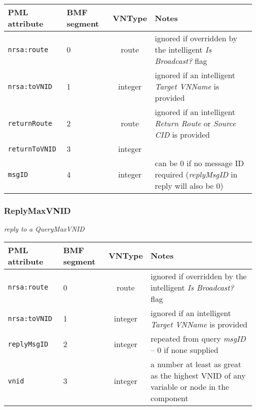 \documentclass[pdftex,a4paper]{article}
\newcommand{\XMLfont}[1]{{\tt \small #1}}
\begin{document}
\begin{table}[!h]
  \begin{center}
    \label{tab:QueryMaxVNID}
    \begin{tabular}{|l|p{13mm}|c|p{60mm}|}
      \hline

      \textbf{PML attribute} & \textbf{BMF segment} & \textbf{VNType}
      & \textbf{Notes} \\\hline

      \XMLfont{nrsa:route} & 0 & route & ignored if overridden by the
      intelligent {\em Is Broadcast?} flag \\\hline

      \XMLfont{nrsa:toVNID} & 1 & integer & ignored if an intelligent {\em
      Target VNName} is provided \\\hline

      \XMLfont{returnRoute} & 2 & route & ignored if an
      intelligent {\em Return Route} or {\em Source CID} is provided
      \\\hline

      \XMLfont{returnToVNID} & 3 & integer & \\\hline

      \XMLfont{msgID} & 4 & integer & can be 0 if no message ID
      required ({\em replyMsgID} in reply will also be 0) \\\hline

    \end{tabular}
  \end{center}
\end{table}


\subsubsection{ReplyMaxVNID}
{\em reply to a QueryMaxVNID}

\begin{table}[!h]
  \begin{center}
    \label{tab:ReplyMaxVNID}
    \begin{tabular}{|l|p{13mm}|c|p{60mm}|}
      \hline

      \textbf{PML attribute} & \textbf{BMF segment} & \textbf{VNType}
      & \textbf{Notes} \\\hline

      \XMLfont{nrsa:route} & 0 & route & ignored if overridden by the
      intelligent {\em Is Broadcast?} flag \\ \hline

      \XMLfont{nrsa:toVNID} & 1 & integer & ignored if an intelligent {\em
      Target VNName} is provided \\\hline

      \XMLfont{replyMsgID} & 2 & integer & repeated from query {\em
      msgID} -- 0 if none supplied \\\hline

      \XMLfont{vnid} & 3 & integer & a number at least as great as the
      highest VNID of any variable or node in the component \\\hline

    \end{tabular}
  \end{center}
\end{table}
\end{document}
